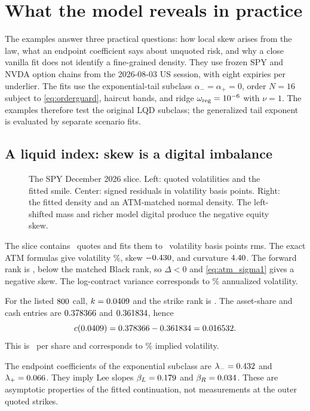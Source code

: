 \section{What the model reveals in practice}
\label{sec:examples}

The examples answer three practical questions: how local skew arises from the
law, what an endpoint coefficient says about unquoted risk, and why a close
vanilla fit does not identify a fine-grained density.  They use frozen SPY and
NVDA option chains from the 2026-08-03 US session, with eight expiries per
underlier.  The fits use the exponential-tail subclass
$\alpha_-=\alpha_+=0$, order $N=16$ subject to
\eqref{eq:orderguard}, haircut bands, and ridge
$\omega_{\rm reg}=10^{-6}$ with $\nu=1$.  The examples therefore test the
original LQD subclass; the generalized tail exponent is evaluated by separate
scenario fits.

\subsection{A liquid index: skew is a digital imbalance}

\begin{figure}[htbp]
\centering
{}
\caption{The SPY December 2026 slice.  Left: quoted volatilities and the
fitted smile.  Center: signed residuals in volatility basis points.  Right:
the fitted density and an ATM-matched normal density.  The left-shifted mass
and richer model digital produce the negative equity skew.}
\label{fig:spy_node}
\end{figure}

The slice contains \MacSpyDecNQuotes\ quotes and fits them to
\MacSpyDecRmsBp\ volatility basis points rms.  The exact ATM formulas give
volatility \MacSpyDecAtmVolPct\%, skew $-0.430$, and curvature
$4.40$.  The forward rank is \MacSpyDecForwardRankPct, below the
matched Black rank, so $\Delta<0$ and \eqref{eq:atm_sigma1} gives a negative
skew.  The log-contract variance corresponds to
\MacSpyDecVarSwapPct\% annualized volatility.

For the listed $800$ call, $k=0.0409$ and the strike rank is
\MacTicketRankPct.  The asset-share and cash entries are
$0.378366$ and $0.361834$, hence
\[
c(0.0409)=0.378366-0.361834=0.016532.
\]
This is \MacTicketDollarPrice\ per share and corresponds to
\MacTicketIvPct\% implied volatility.

The endpoint coefficients of the exponential subclass are
$\lambda_-=0.432$ and $\lambda_+=0.066$.  They imply Lee slopes
$\beta_L=0.179$ and $\beta_R=0.034$.  These are asymptotic
properties of the fitted continuation, not measurements at the outer quoted
strikes.

